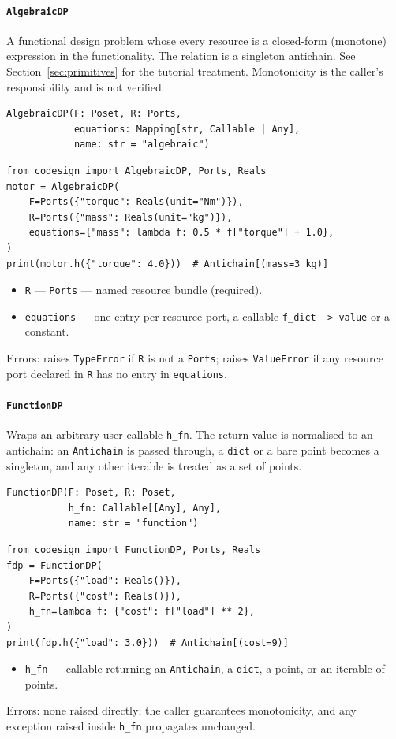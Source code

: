 \documentclass[11pt,a4paper]{article}
\begin{document}
\paragraph{\texttt{AlgebraicDP}}
\label{ref:dp:algebraicdp}
A functional design problem whose every resource is a closed-form
(monotone) expression in the functionality. The relation is a
singleton antichain. See Section~\ref{sec:primitives} for the tutorial
treatment. Monotonicity is the caller's responsibility and is not
verified.
\begin{lstlisting}
AlgebraicDP(F: Poset, R: Ports,
            equations: Mapping[str, Callable | Any],
            name: str = "algebraic")
\end{lstlisting}
\begin{lstlisting}
from codesign import AlgebraicDP, Ports, Reals
motor = AlgebraicDP(
    F=Ports({"torque": Reals(unit="Nm")}),
    R=Ports({"mass": Reals(unit="kg")}),
    equations={"mass": lambda f: 0.5 * f["torque"] + 1.0},
)
print(motor.h({"torque": 4.0}))  # Antichain[(mass=3 kg)]
\end{lstlisting}
\begin{itemize}[nosep]
  \item \texttt{R} --- \texttt{Ports} --- named resource bundle
        (required).
  \item \texttt{equations} --- one entry per resource port, a callable
        \texttt{f\_dict -> value} or a constant.
\end{itemize}
Errors: raises \texttt{TypeError} if \texttt{R} is not a \texttt{Ports};
raises \texttt{ValueError} if any resource port declared in \texttt{R}
has no entry in \texttt{equations}.

\paragraph{\texttt{FunctionDP}}
\label{ref:dp:functiondp}
Wraps an arbitrary user callable \texttt{h\_fn}. The return value is
normalised to an antichain: an \texttt{Antichain} is passed through, a
\texttt{dict} or a bare point becomes a singleton, and any other
iterable is treated as a set of points.
\begin{lstlisting}
FunctionDP(F: Poset, R: Poset,
           h_fn: Callable[[Any], Any],
           name: str = "function")
\end{lstlisting}
\begin{lstlisting}
from codesign import FunctionDP, Ports, Reals
fdp = FunctionDP(
    F=Ports({"load": Reals()}),
    R=Ports({"cost": Reals()}),
    h_fn=lambda f: {"cost": f["load"] ** 2},
)
print(fdp.h({"load": 3.0}))  # Antichain[(cost=9)]
\end{lstlisting}
\begin{itemize}[nosep]
  \item \texttt{h\_fn} --- callable returning an \texttt{Antichain}, a
        \texttt{dict}, a point, or an iterable of points.
\end{itemize}
Errors: none raised directly; the caller guarantees monotonicity, and
any exception raised inside \texttt{h\_fn} propagates unchanged.
\end{document}
